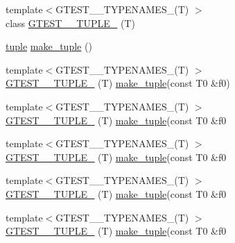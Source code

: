 \begin{DoxyCompactItemize}
\item 
{\footnotesize template$<$G\+T\+E\+S\+T\+\_\+\_\+\+T\+Y\+P\+E\+N\+A\+M\+E\+S\+\_\+(\+T) $>$ }\\class \mbox{\hyperlink{namespacestd_1_1tr1_ab4f2c7d5458171bec6c4330fc5c7aba6}{G\+T\+E\+S\+T\+\_\+\_\+\+T\+U\+P\+L\+E\+\_\+}} (T)
\item 
\mbox{\hyperlink{classstd_1_1tr1_1_1tuple}{tuple}} \mbox{\hyperlink{namespacestd_1_1tr1_af7e12a0f5b5791b5b7c49a5a17b85359}{make\+\_\+tuple}} ()
\item 
{\footnotesize template$<$G\+T\+E\+S\+T\+\_\+\_\+\+T\+Y\+P\+E\+N\+A\+M\+E\+S\+\_\+(\+T) $>$ }\\\mbox{\hyperlink{namespacestd_1_1tr1_a8b196fb65b7521a688f59c51418ab191}{G\+T\+E\+S\+T\+\_\+\_\+\+T\+U\+P\+L\+E\+\_\+}} (T) \mbox{\hyperlink{namespacestd_1_1tr1_af7e12a0f5b5791b5b7c49a5a17b85359}{make\+\_\+tuple}}(const T0 \&f0)
\item 
{\footnotesize template$<$G\+T\+E\+S\+T\+\_\+\_\+\+T\+Y\+P\+E\+N\+A\+M\+E\+S\+\_\+(\+T) $>$ }\\\mbox{\hyperlink{namespacestd_1_1tr1_a90d9f0e7f95fa1c2093372d72493c3c1}{G\+T\+E\+S\+T\+\_\+\_\+\+T\+U\+P\+L\+E\+\_\+}} (T) \mbox{\hyperlink{namespacestd_1_1tr1_af7e12a0f5b5791b5b7c49a5a17b85359}{make\+\_\+tuple}}(const T0 \&f0
\item 
{\footnotesize template$<$G\+T\+E\+S\+T\+\_\+\_\+\+T\+Y\+P\+E\+N\+A\+M\+E\+S\+\_\+(\+T) $>$ }\\\mbox{\hyperlink{namespacestd_1_1tr1_a4493d91e61718415264f7e72fea42930}{G\+T\+E\+S\+T\+\_\+\_\+\+T\+U\+P\+L\+E\+\_\+}} (T) \mbox{\hyperlink{namespacestd_1_1tr1_af7e12a0f5b5791b5b7c49a5a17b85359}{make\+\_\+tuple}}(const T0 \&f0
\item 
{\footnotesize template$<$G\+T\+E\+S\+T\+\_\+\_\+\+T\+Y\+P\+E\+N\+A\+M\+E\+S\+\_\+(\+T) $>$ }\\\mbox{\hyperlink{namespacestd_1_1tr1_a4e57e6fab4219802275bd31821b31b58}{G\+T\+E\+S\+T\+\_\+\_\+\+T\+U\+P\+L\+E\+\_\+}} (T) \mbox{\hyperlink{namespacestd_1_1tr1_af7e12a0f5b5791b5b7c49a5a17b85359}{make\+\_\+tuple}}(const T0 \&f0
\item 
{\footnotesize template$<$G\+T\+E\+S\+T\+\_\+\_\+\+T\+Y\+P\+E\+N\+A\+M\+E\+S\+\_\+(\+T) $>$ }\\\mbox{\hyperlink{namespacestd_1_1tr1_a6f8af2da768a7ea1e48b2700d1288166}{G\+T\+E\+S\+T\+\_\+\_\+\+T\+U\+P\+L\+E\+\_\+}} (T) \mbox{\hyperlink{namespacestd_1_1tr1_af7e12a0f5b5791b5b7c49a5a17b85359}{make\+\_\+tuple}}(const T0 \&f0
\item 

\end{DoxyCompactItemize}
